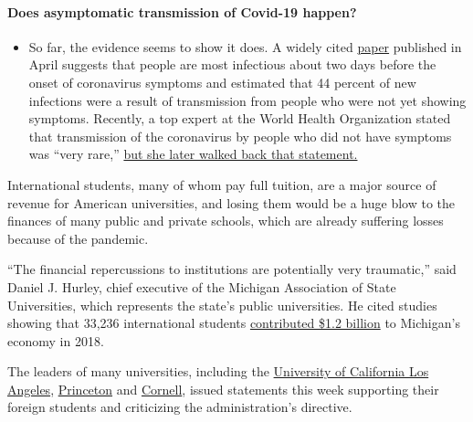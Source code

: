 \begin{itemize}
{  \paragraph{Does asymptomatic transmission of Covid-19
  happen?}\label{does-asymptomatic-transmission-of-covid-19-happen}}

  \begin{itemize}
  \tightlist
  \item
    So far, the evidence seems to show it does. A widely cited
    \href{https://www.nature.com/articles/s41591-020-0869-5}{paper}
    published in April suggests that people are most infectious about
    two days before the onset of coronavirus symptoms and estimated that
    44 percent of new infections were a result of transmission from
    people who were not yet showing symptoms. Recently, a top expert at
    the World Health Organization stated that transmission of the
    coronavirus by people who did not have symptoms was ``very rare,''
    \href{https://www.nytimes.com/2020/06/09/world/coronavirus-updates.html?action=click\&pgtype=Article\&state=default\&region=MAIN_CONTENT_3\&context=storylines_faq\#link-1f302e21}{but
    she later walked back that statement.}
  \end{itemize}
\end{itemize}

International students, many of whom pay full tuition, are a major
source of revenue for American universities, and losing them would be a
huge blow to the finances of many public and private schools, which are
already suffering losses because of the pandemic.

``The financial repercussions to institutions are potentially very
traumatic,'' said Daniel J. Hurley, chief executive of the Michigan
Association of State Universities, which represents the state's public
universities. He cited studies showing that 33,236 international
students
\href{https://www.nafsa.org/isev/reports/state?year=2018\&state=MI}{contributed
\$1.2 billion} to Michigan's economy in 2018.

The leaders of many universities, including the
\href{https://chancellor.ucla.edu/messages/standing-international-students/}{University
of California Los Angeles},
\href{https://www.princeton.edu/news/2020/07/08/president-eisgruber-princeton-stands-firmly-international-students-face-ice}{Princeton}
and
\href{https://news.cornell.edu/stories/2020/07/pollack-sends-message-support-international-students}{Cornell},
issued statements this week supporting their foreign students and
criticizing the administration's directive.

